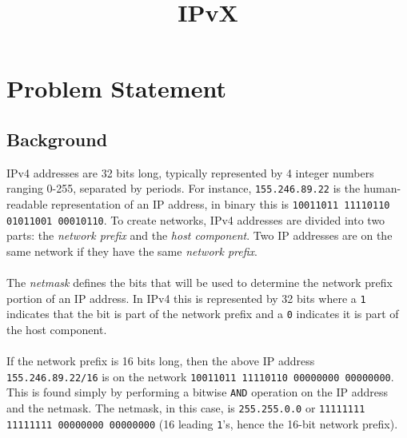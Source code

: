 \documentclass[11pt]{article}
\title{\textbf{IPvX}}
\date{}
\begin{document}
\maketitle

\section{Problem Statement}

\subsection{Background}
IPv4 addresses are 32 bits long, typically represented by 4 integer numbers ranging 0-255, separated by periods. For instance, \texttt{155.246.89.22} is the human-readable representation of an IP address, in binary this is \texttt{10011011 11110110 01011001 00010110}. To create networks, IPv4 addresses are divided into two parts: the \emph{network prefix} and the \emph{host component}. Two IP addresses are on the same network if they have the same \emph{network prefix}.
\\\\
The \emph{netmask} defines the bits that will be used to determine the network prefix portion of an IP address. In IPv4 this is represented by 32 bits where a \texttt{1} indicates that the bit is part of the network prefix and a \texttt{0} indicates it is part of the host component.
\\\\
If the network prefix is 16 bits long, then the above IP address \texttt{155.246.89.22/16} is on the network \texttt{10011011 11110110 00000000 00000000}. This is found simply by performing a bitwise \texttt{AND} operation on the IP address and the netmask. The netmask, in this case, is \texttt{255.255.0.0} or 
\texttt{11111111 11111111 00000000 00000000} (16 leading \texttt{1}'s, hence the 16-bit network prefix).
\end{document}
